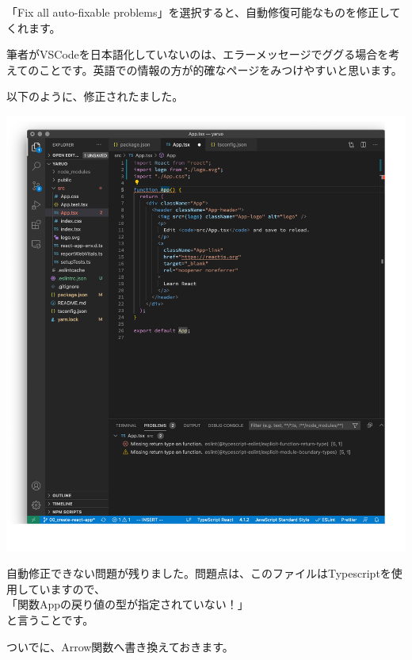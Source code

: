 「Fix all auto{-}fixable problems」を選択すると、自動修復可能なものを修正してくれます。

\begin{starternote}[]{}

筆者がVSCodeを日本語化していないのは、エラーメッセージでググる場合を考えてのことです。英語での情報の方が的確なページをみつけやすいと思います。

\end{starternote}

以下のように、修正されたました。

\begin{reviewimage}[H]%
\includegraphics[width=1.0\maxwidth]{./images/02-create-react-app/05_eslint_prettier_fixdone.png}%
\label{image:02-create-react-app:05_eslint_prettier_fixdone}
\end{reviewimage}

自動修正できない問題が残りました。問題点は、このファイルはTypescriptを使用していますので、\\[0pt]
「関数Appの戻り値の型が指定されていない！」\\[0pt]
と言うことです。

ついでに、Arrow関数へ書き換えておきます。


